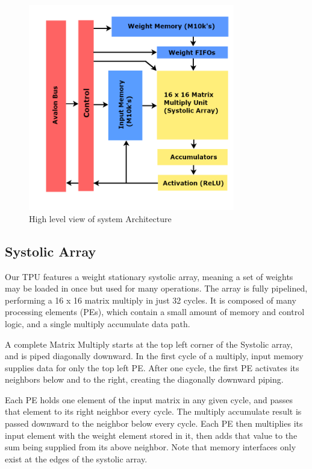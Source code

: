 \documentclass[11pt, conference, onecolumn]{IEEEtran}
\begin{document}
        \begin{figure}[htbp]
            \centering
            \includegraphics[width=9cm]{../figures/sysArchitecture.png}
            \caption{High level view of system Architecture}
        \end{figure}

    \subsection{Systolic Array}
        Our TPU features a weight stationary systolic array, meaning a set of weights may
        be loaded in once but used for many operations. The array is fully pipelined,
        performing a 16 x 16 matrix multiply in just 32 cycles. It is composed of many
        processing elements (PEs), which contain a small amount of memory and control
        logic, and a single multiply accumulate data path.

        A complete Matrix Multiply starts at the top left corner of the Systolic array,
        and is piped diagonally downward. In the first cycle of a multiply, input memory
        supplies data for only the top left PE. After one cycle, the first PE
        activates its neighbors below and to the right, creating the diagonally downward
        piping.

        Each PE holds one element of the input matrix in any given cycle, and passes that
        element to its right neighbor every cycle. The multiply accumulate result is
        passed downward to the neighbor below every cycle. Each PE then multiplies its
        input element with the weight element stored in it, then adds that value to the
        sum being supplied from its above neighbor. Note that memory interfaces only exist
        at the edges of the systolic array.
\end{document}
